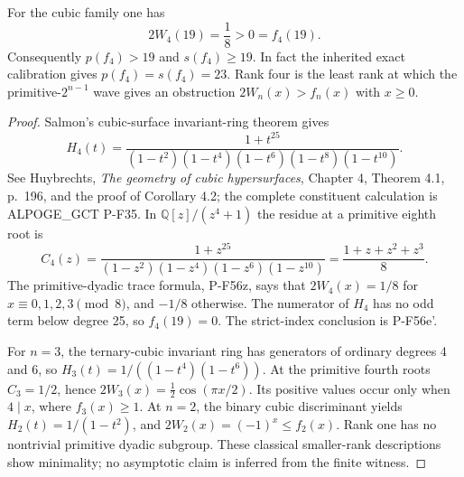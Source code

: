 \begin{proposition}
For the cubic family one has
\[
                  2W_4(19)=\frac18>0=f_4(19).
\]
Consequently $p(f_4)>19$ and $s(f_4)\ge19$.  In fact the inherited
exact calibration gives $p(f_4)=s(f_4)=23$.  Rank four is the least
rank at which the primitive-$2^{n-1}$ wave gives an obstruction
$2W_n(x)>f_n(x)$ with $x\ge0$.
\end{proposition}
\begin{proof}
Salmon's cubic-surface invariant-ring theorem gives
\[
 H_4(t)=\frac{1+t^{25}}{(1-t^2)(1-t^4)(1-t^6)(1-t^8)(1-t^{10})}.
\]
See Huybrechts, \emph{The geometry of cubic hypersurfaces}, Chapter 4,
Theorem 4.1, p.\ 196, and the proof of Corollary 4.2; the complete
constituent calculation is ALPOGE\_GCT P-F35.  In
$\mathbb Q[z]/(z^4+1)$ the residue at a primitive eighth root is
\[
 C_4(z)=\frac{1+z^{25}}{(1-z^2)(1-z^4)(1-z^6)(1-z^{10})}
       =\frac{1+z+z^2+z^3}{8}.
\]
The primitive-dyadic trace formula, P-F56z, says that
$2W_4(x)=1/8$ for $x\equiv0,1,2,3\pmod8$, and $-1/8$ otherwise.
The numerator of $H_4$ has no odd term below degree 25, so
$f_4(19)=0$.  The strict-index conclusion is P-F56e'.

For $n=3$, the ternary-cubic invariant ring has generators of
ordinary degrees 4 and 6, so $H_3(t)=1/((1-t^4)(1-t^6))$.
At the primitive fourth roots $C_3=1/2$, hence
$2W_3(x)=\tfrac12\cos(\pi x/2)$.  Its positive values occur only
when $4\mid x$, where $f_3(x)\ge1$.  At $n=2$, the binary cubic
discriminant yields $H_2(t)=1/(1-t^2)$, and
$2W_2(x)=(-1)^x\le f_2(x)$.  Rank one has no nontrivial primitive
dyadic subgroup.  These classical smaller-rank descriptions show
minimality; no asymptotic claim is inferred from the finite witness.
\end{proof}

